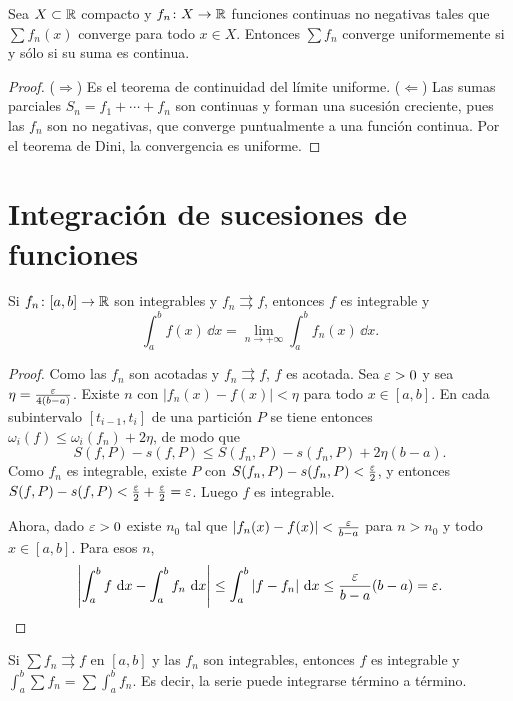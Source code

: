 \begin{corollary}
  Sea \(X \subset \mathbb{R}\) compacto y \(f_n\colon X \to \mathbb{R}\) funciones continuas no negativas tales que \(\sum f_n(x)\) converge para todo \(x \in X\). Entonces \(\sum f_n\) converge uniformemente si y sólo si su suma es continua.
\end{corollary}

\begin{proof}
  (\(\Rightarrow\)) Es el teorema de continuidad del límite uniforme. (\(\Leftarrow\)) Las sumas parciales \(S_n = f_1 + \cdots + f_n\) son continuas y forman una sucesión creciente, pues las \(f_n\) son no negativas, que converge puntualmente a una función continua. Por el teorema de Dini, la convergencia es uniforme.
\end{proof}

\section{Integración de sucesiones de funciones}

\begin{theorem}
  Si \(f_n\colon [a, b] \to \mathbb{R}\) son integrables y \(f_n \rightrightarrows f\), entonces \(f\) es integrable y
  \[
    \int_a^b f(x) \,\dd x = \lim_{n \to +\infty} \int_a^b f_n(x) \,\dd x.
  \]
\end{theorem}

\begin{proof}
  Como las \(f_n\) son acotadas y \(f_n \rightrightarrows f\), \(f\) es acotada. Sea \(\varepsilon > 0\) y sea \(\eta = \frac{\varepsilon}{4(b - a)}\). Existe \(n\) con \(|f_n(x) - f(x)| < \eta\) para todo \(x \in [a, b]\). En cada subintervalo \([t_{i-1}, t_i]\) de una partición \(P\) se tiene entonces \(\omega_i(f) \leq \omega_i(f_n) + 2\eta\), de modo que
  \[
    S(f, P) - s(f, P) \leq S(f_n, P) - s(f_n, P) + 2\eta (b - a).
  \]
  Como \(f_n\) es integrable, existe \(P\) con \(S(f_n, P) - s(f_n, P) < \frac{\varepsilon}{2}\), y entonces \(S(f, P) - s(f, P) < \frac{\varepsilon}{2} + \frac{\varepsilon}{2} = \varepsilon\). Luego \(f\) es integrable.

  Ahora, dado \(\varepsilon > 0\) existe \(n_0\) tal que \(|f_n(x) - f(x)| < \frac{\varepsilon}{b - a}\) para \(n > n_0\) y todo \(x \in [a, b]\). Para esos \(n\),
  \[
    \left| \int_a^b f \,\mathop{}\!\mathrm{d} x - \int_a^b f_n \,\mathop{}\!\mathrm{d} x \right| \leq \int_a^b |f - f_n| \,\mathop{}\!\mathrm{d} x \leq \frac{\varepsilon}{b - a} (b - a) = \varepsilon. \qedhere
  \]
\end{proof}

\begin{corollary}
  Si \(\sum f_n \rightrightarrows f\) en \([a, b]\) y las \(f_n\) son integrables, entonces \(f\) es integrable y \(\int_a^b \sum f_n = \sum \int_a^b f_n\). Es decir, la serie puede integrarse término a término.
\end{corollary}

